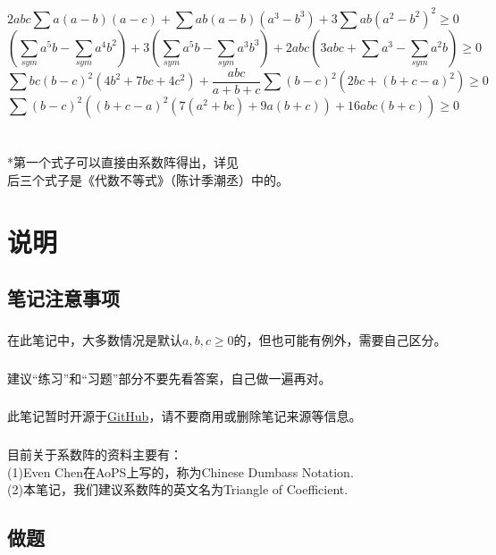 \documentclass[UTF8]{ctexart}
\begin{document}
\\
\\
\\
\\
$$
2abc\displaystyle \sum  a(a-b)(a-c)+\displaystyle \sum  ab(a-b)(a^{3}-b^{3})+3\displaystyle \sum  ab(a^{2}-b^{2})^{2}\ge 0 $$
$$ (\displaystyle \sum _{sym} a^{5}b-\displaystyle \sum _{sym}a^{4}b^{2})+3(\displaystyle \sum _{sym}a^{5}b-\displaystyle \sum _{sym}a^{3}b^{3})+2abc(3abc+\displaystyle \sum a^{3}-\displaystyle \sum _{sym}a^{2}b)\geq 0
$$
$$ \displaystyle \sum bc(b-c)^{2}(4b^{2}+7bc+4c^{2})+\dfrac{abc}{a+b+c}
\displaystyle \sum (b-c)^{2}(2bc+(b+c-a)^{2}) \ge 0$$
$$ \displaystyle \sum (b-c)^{2}((b+c-a)^{2}(7(a^{2}+bc)+9a(b+c))+16abc(b+c))\ge 0
$$
\\
\\
*第一个式子可以直接由系数阵得出，详见\pageref{key3}\\
后三个式子是《代数不等式》（陈计\quad 季潮丞）中的。
\newpage
\tableofcontents
\newpage
\setcounter{page}{1}
\section{说明} 
\subsection{笔记注意事项}
\subsubsection{}在此笔记中，大多数情况是默认$ a,b,c\geq 0 $的，但也可能有例外，需要自己区分。
\subsubsection{}建议“练习”和“习题”部分不要先看答案，自己做一遍再对。
\subsubsection{}
此笔记暂时开源于\href{https://github.com/Raymond0Hui/LaTeXwork-open}{GitHub}，请不要商用或删除笔记来源等信息。
\subsubsection{}
目前关于系数阵的资料主要有：\\
(1)Even Chen在AoPS上写的，称为Chinese Dumbass Notation.\\
(2)本笔记，我们建议系数阵的英文名为Triangle of Coefficient.
\subsection{做题}
\end{document}
